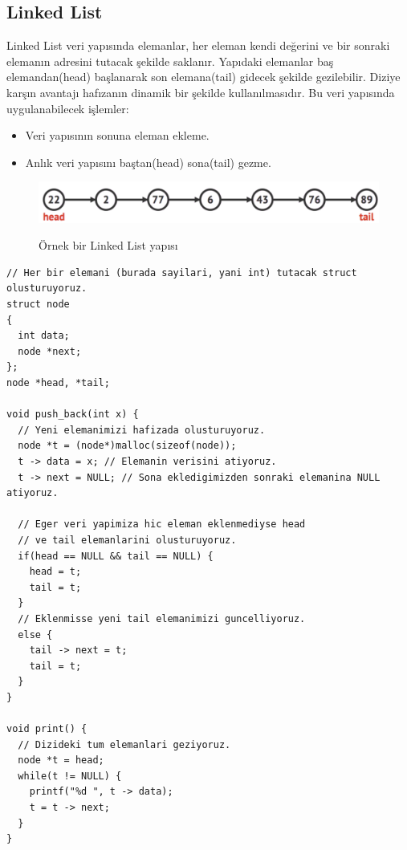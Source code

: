 \documentclass[12pt]{article}
\begin{document}
	\subsection{Linked List}
	
	Linked List veri yap{\i}s{\i}nda elemanlar, her eleman kendi de\u{g}erini ve bir sonraki eleman{\i}n adresini tutacak \c{s}ekilde saklan{\i}r. Yap{\i}daki elemanlar ba\c{s} elemandan(head) ba\c{s}lanarak son elemana(tail) gidecek \c{s}ekilde gezilebilir. Diziye kar\c{s}{\i}n avantaj{\i} haf{\i}zan{\i}n dinamik bir \c{s}ekilde kullan{\i}lmas{\i}d{\i}r. Bu veri yap{\i}s{\i}nda uygulanabilecek i\c{s}lemler:
	
	\begin{itemize}
        \item Veri yap{\i}s{\i}n{\i}n sonuna eleman ekleme.
        \item Anl{\i}k veri yap{\i}s{\i}n{\i} ba\c{s}tan(head) sona(tail) gezme.
    \end{itemize}

	\begin{figure}[h]
		\centering
		\includegraphics[width=\linewidth/1]{linkedlist.png}
		\label{fig:linkedlist}
        \caption{\"{O}rnek bir Linked List yap{\i}s{\i}}
	\end{figure}        
    
    \clearpage

    \begin{verbatim}
// Her bir elemani (burada sayilari, yani int) tutacak struct olusturuyoruz.
struct node
{
  int data;
  node *next;
};
node *head, *tail;

void push_back(int x) {
  // Yeni elemanimizi hafizada olusturuyoruz.
  node *t = (node*)malloc(sizeof(node)); 
  t -> data = x; // Elemanin verisini atiyoruz.
  t -> next = NULL; // Sona ekledigimizden sonraki elemanina NULL atiyoruz.

  // Eger veri yapimiza hic eleman eklenmediyse head 
  // ve tail elemanlarini olusturuyoruz.
  if(head == NULL && tail == NULL) {
    head = t;
    tail = t;
  }
  // Eklenmisse yeni tail elemanimizi guncelliyoruz.
  else {
    tail -> next = t; 
    tail = t;
  }
}

void print() {
  // Dizideki tum elemanlari geziyoruz.
  node *t = head;
  while(t != NULL) {
    printf("%d ", t -> data);
    t = t -> next;
  }
}
    \end{verbatim}
\end{document}
